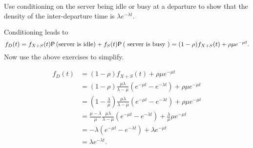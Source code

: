 \begin{extra}\label{ex:63}
Use conditioning on the server being idle or busy at a departure to show that  the density of  the inter-departure time is $\lambda e^{-\lambda t}$.
\begin{hint}
Conditioning leads to 
\begin{equation*}
    f_D(t) = f_{X+S}(t) \P{\text{server is idle}} + f_S(t) \P{\text{ server is busy }}= (1-\rho) f_{X+S}(t) +
    \rho \mu e^{-\mu t}.
\end{equation*}
    Now use the above exercises to simplify.
\end{hint}
\begin{solution}
       \begin{align*}
    f_D(t) 
&= (1-\rho) f_{X+S}(t) +    \rho \mu e^{-\mu t} \\
&= (1-\rho) \frac{\mu\lambda}{\lambda-\mu} \left(e^{-\mu t}-e^{-\lambda t}\right) +    \rho \mu e^{-\mu t} \\
&= \left(1-\frac{\lambda}\mu\right) \frac{\mu\lambda}{\lambda-\mu}\left(e^{-\mu t}-e^{-\lambda t}\right)  +    \rho \mu e^{-\mu t} \\
&= \frac{\mu-\lambda}\mu \frac{\mu\lambda}{\lambda-\mu}\left(e^{-\mu t}-e^{-\lambda t}\right)  +    \frac\lambda \mu \mu e^{-\mu t} \\
&= - \lambda\left(e^{-\mu t}-e^{-\lambda t}\right)  +    \lambda e^{-\mu t} \\
&=  \lambda e^{-\lambda t}.
      \end{align*}
\end{solution}
\end{extra}






